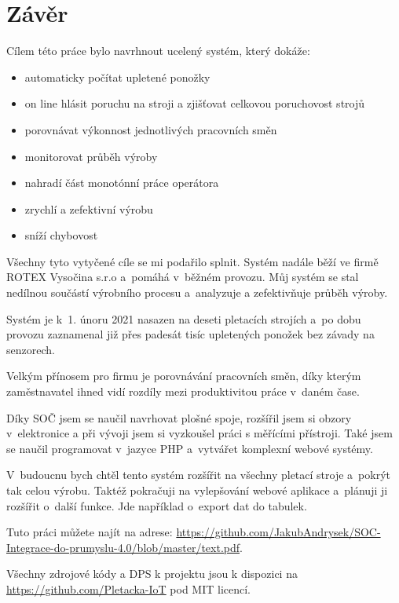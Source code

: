 \chapter*{Závěr}

Cílem této práce bylo navrhnout ucelený systém, který dokáže:

\begin{itemize}
    \item automaticky počítat upletené ponožky
    \item on line hlásit poruchu na stroji a zjišťovat celkovou poruchovost strojů
    \item porovnávat výkonnost jednotlivých pracovních směn
    \item monitorovat průběh výroby
    \item nahradí část monotónní práce operátora
    \item zrychlí a zefektivní výrobu
    \item sníží chybovost
\end{itemize}

Všechny tyto vytyčené cíle se mi podařilo splnit. Systém nadále běží ve firmě ROTEX Vysočina s.r.o \cite{ROTEX} a~pomáhá v~běžném provozu.
Můj systém se stal nedílnou součástí výrobního procesu a analyzuje a zefektivňuje průběh výroby.

Systém je k 1. únoru 2021 nasazen na deseti pletacích strojích a po dobu provozu zaznamenal již přes padesát tisíc upletených ponožek bez závady na senzorech.

Velkým přínosem pro firmu je porovnávání pracovních směn, díky kterým zaměstnavatel ihned vidí rozdíly mezi produktivitou práce v~daném čase.

Díky SOČ jsem se naučil navrhovat plošné spoje, rozšířil jsem si obzory v~elektronice a při vývoji jsem si vyzkoušel práci s měřícími přístroji. 
Také jsem se naučil programovat v~jazyce PHP a~vytvářet komplexní webové systémy.

V~budoucnu bych chtěl tento systém rozšířit na všechny pletací stroje a~pokrýt tak celou výrobu.
Taktéž pokračuji na vylepšování webové aplikace a~plánuji ji rozšířit o~další funkce.
Jde například o~export dat do tabulek.

Tuto práci můžete najít na adrese: \url{https://github.com/JakubAndrysek/SOC-Integrace-do-prumyslu-4.0/blob/master/text.pdf}.

Všechny zdrojové kódy a DPS k projektu jsou k dispozici na \url{https://github.com/Pletacka-IoT} pod MIT licencí.


\newpage